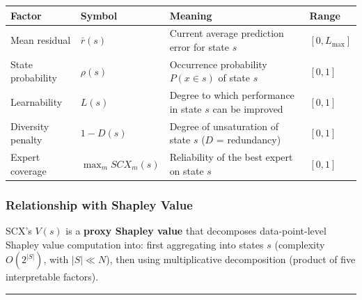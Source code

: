 \documentclass[
  12pt,
]{ctexart}
\begin{document}
\begin{longtable}[]{@{}
  >{\raggedright\arraybackslash}p{}
  >{\raggedright\arraybackslash}p{}
  >{\raggedright\arraybackslash}p{}
  >{\raggedright\arraybackslash}p{}@{}}
\toprule\noalign{}
\begin{minipage}[b]{\linewidth}\raggedright
Factor
\end{minipage} & \begin{minipage}[b]{\linewidth}\raggedright
Symbol
\end{minipage} & \begin{minipage}[b]{\linewidth}\raggedright
Meaning
\end{minipage} & \begin{minipage}[b]{\linewidth}\raggedright
Range
\end{minipage} \\
\midrule\noalign{}
\endhead
\bottomrule\noalign{}
\endlastfoot
Mean residual & \(\bar{r}(s)\) & Current average prediction error for state \(s\) &
\([0, L_{\max}]\) \\
State probability & \(\rho(s)\) & Occurrence probability \(P(x \in s)\) of state \(s\) &
\([0, 1]\) \\
Learnability & \(L(s)\) & Degree to which performance in state \(s\) can be improved & \([0, 1]\) \\
Diversity penalty & \(1-D(s)\) & Degree of unsaturation of state \(s\) (\(D\) = redundancy) &
\([0, 1]\) \\
Expert coverage & \(\max_m SCX_m(s)\) & Reliability of the best expert on state \(s\) &
\([0, 1]\) \\
\end{longtable}

\subsubsection{Relationship with Shapley Value}\label{relationship-with-shapley-value}

SCX's \(V(s)\) is a \textbf{proxy Shapley value} that decomposes data-point-level Shapley value computation into: first aggregating into states \(s\) (complexity \(O(2^{|S|})\), with \(|S| \ll N\)), then using multiplicative decomposition (product of five interpretable factors).

\begin{center}\rule{0.5\linewidth}{0.5pt}\end{center}
\end{document}
